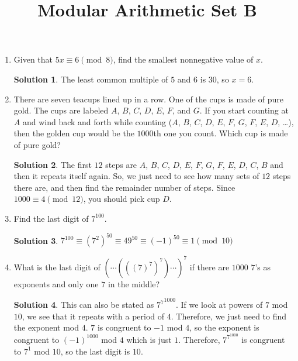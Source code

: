 \documentclass{article}
\title{Modular Arithmetic Set B}
\date{}
\author{}
\theoremstyle{definition}
\newtheorem*{solution}{Solution}
\begin{document}
\maketitle
\begin{multicols}{2}
    \raggedcolumns
    \begin{enumerate}
        \item Given that $5x \equiv 6 \pmod{8}$, find the smallest nonnegative value of $x$.
            \begin{solution}
                The least common multiple of $5$ and $6$ is $30$, so $x = 6$.
            \end{solution}
        \item There are seven teacups lined up in a row.
            One of the cups is made of pure gold.
            The cups are labeled $A$, $B$, $C$, $D$, $E$, $F$, and $G$.
            If you start counting at $A$ and wind back and forth while counting ($A$, $B$, $C$, $D$, $E$, $F$, $G$, $F$, $E$, $D$, \dots), then the golden cup would be the $1000$th one you count.
            Which cup is made of pure gold?
            \begin{solution}
                The first $12$ steps are $A$, $B$, $C$, $D$, $E$, $F$, $G$, $F$, $E$, $D$, $C$, $B$ and then it repeats itself again.
                So, we just need to see how many sets of $12$ steps there are, and then find the remainder number of steps.
                Since $1000 \equiv 4 \pmod{12}$, you should pick cup $D$.
            \end{solution}
        \item Find the last digit of $7^{100}$.
            \begin{solution}
				$7^{100} \equiv (7^2)^{50} \equiv 49^{50} \equiv (-1)^{50} \equiv 1 \pmod{10}$
            \end{solution}
        \item What is the last digit of $(\cdots(((7)^7)^7)\cdots)^7$ if there are $1000$ $7$'s as exponents and only one $7$ in the middle?
            \begin{solution}
                This can also be stated as ${7^7}^{1000}$.
				If we look at powers of $7$ mod $10$, we see that it repeats with a period of $4$.
				Therefore, we just need to find the exponent mod $4$.
				$7$ is congruent to $-1$ mod $4$, so the exponent is congruent to $(-1)^{1000}$ mod $4$ which is just $1$.
				Therefore, $7^{7^{1000}}$ is congruent to $7^1$ mod $10$, so the last digit is $10$.
            \end{solution}

\end{enumerate}
\end{multicols}
\end{document}
